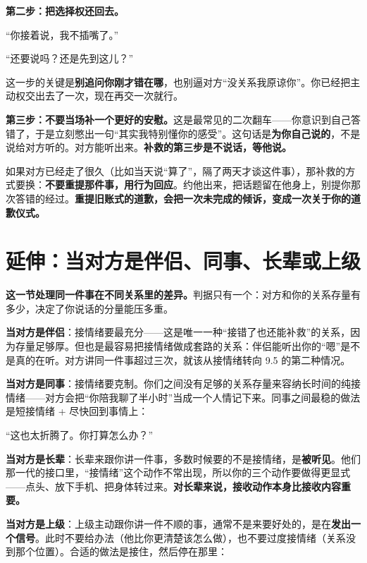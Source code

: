 \textbf{第二步：把选择权还回去。}

\begin{mdquote}
“你接着说，我不插嘴了。”

“还要说吗？还是先到这儿？”
\end{mdquote}

这一步的关键是\textbf{别追问你刚才错在哪}，也别逼对方“没关系我原谅你”。你已经把主动权交出去了一次，现在再交一次就行。

\textbf{第三步：不要当场补一个更好的安慰。}这是最常见的二次翻车——你意识到自己答错了，于是立刻憋出一句“其实我特别懂你的感受”。这句话是\textbf{为你自己说的}，不是说给对方听的。对方能听出来。\textbf{补救的第三步是不说话，等他说。}

如果对方已经走了很久（比如当天说“算了”，隔了两天才谈这件事），那补救的方式要换：\textbf{不要重提那件事，用行为回应}。约他出来，把话题留在他身上，别提你那次答错的经过。\textbf{重提旧账式的道歉，会把一次未完成的倾诉，变成一次关于你的道歉仪式。}

\section{延伸：当对方是伴侣、同事、长辈或上级}

\textbf{这一节处理同一件事在不同关系里的差异。}判据只有一个：对方和你的关系存量有多少，决定了你说话的分量能压多重。

\textbf{当对方是伴侣}：接情绪要最充分——这是唯一一种“接错了也还能补救”的关系，因为存量足够厚。但也是最容易把接情绪做成套路的关系：伴侣能听出你的“嗯”是不是真的在听。对方讲同一件事超过三次，就该从接情绪转向 9.5 的第二种情况。

\textbf{当对方是同事}：接情绪要克制。你们之间没有足够的关系存量来容纳长时间的纯接情绪——对方会把“你陪我聊了半小时”当成一个人情记下来。同事之间最稳的做法是短接情绪 + 尽快回到事情上：

\begin{mdquote}
“这也太折腾了。你打算怎么办？”
\end{mdquote}

\textbf{当对方是长辈}：长辈来跟你讲一件事，多数时候要的不是接情绪，是\textbf{被听见}。他们那一代的接口里，“接情绪”这个动作不常出现，所以你的三个动作要做得更显式——点头、放下手机、把身体转过来。\textbf{对长辈来说，接收动作本身比接收内容重要。}

\textbf{当对方是上级}：上级主动跟你讲一件不顺的事，通常不是来要好处的，是在\textbf{发出一个信号}。此时不要给办法（他比你更清楚该怎么做），也不要过度接情绪（关系没到那个位置）。合适的做法是接住，然后停在那里：


